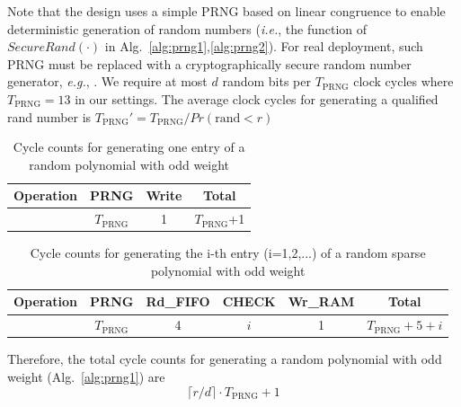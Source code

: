 \documentclass[preprint]{iacrtrans}
\begin{document}

Note that the design uses a simple PRNG based on linear congruence to enable deterministic generation of random numbers (\textit{i.e.}, the function of $SecureRand(\cdot)$ in Alg.~\ref{alg:prng1},\ref{alg:prng2}). For real deployment,
such PRNG must be replaced with a cryptographically secure random number
generator, \textit{e.g.}, \cite{laue2007compact,cherkaoui2013very}. We require at most $d$ random bits per $T_{\text{PRNG}}$ clock cycles where $T_{\text{PRNG}}=13$ in our settings.
The average clock cycles for generating a qualified rand number is $T_{\text{PRNG}}' = T_{\text{PRNG}}/Pr(\text{rand} < r)$

\begin{table}[!tb]\centering
\caption{Cycle counts for generating  one entry of a random polynomial with odd weight}
\begin{tabular}{c|c|c|c}
  \hline
  Operation & PRNG & Write & Total \\\hline
   & $T_{\text{PRNG}}$ & 1  & $T_{\text{PRNG}}$+1 \\
  \hline
\end{tabular}
\end{table}

\begin{table}[!tb]\centering
\caption{Cycle counts for generating  the i-th entry (i=1,2,...) of a random sparse polynomial with odd weight}
\begin{tabular}{c|c|c|c|c|c}
  \hline
  Operation & PRNG & Rd\_FIFO & CHECK &Wr\_RAM & Total \\\hline
   & $T_{\text{PRNG}}$ & 4  & $i$ & 1 &$T_{\text{PRNG}}+5+i$ \\
  \hline
\end{tabular}
\end{table}

Therefore, the total cycle counts for generating a random polynomial with odd weight (Alg.~\ref{alg:prng1}) are
\[
    \lceil r/d\rceil\cdot T_{\text{PRNG}} + 1
\]
\end{document}
